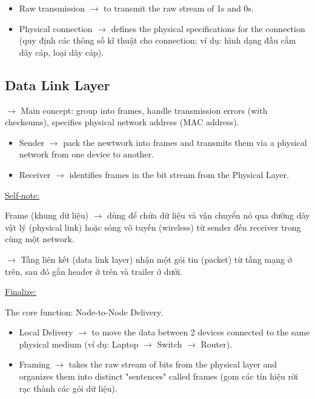 \begin{itemize}
    \item Raw transmission $\rightarrow$ to transmit the raw stream of 1s and 0s.
    \item Physical connection $\rightarrow$ defines the physical specifications for the connection (quy định các thông số kĩ thuật cho connection; ví dụ: hình dạng đầu cắm dây cáp, loại dây cáp).
\end{itemize}

\subsection{Data Link Layer}

\noindent
$\rightarrow$ Main concept: group into frames, handle transmission errors (with checksums), specifies physical network address (MAC address).
\medskip

\begin{itemize}
    \item Sender $\rightarrow$ pack the newtwork into frames and transmits them via a physical network from one device to another.
    \item Receiver $\rightarrow$ identifies frames in the bit stream from the Physical Layer.
\end{itemize}
\medskip

\noindent
\underline{Self-note:}
\medskip

\noindent
Frame (khung dữ liệu) $\rightarrow$ dùng để chứa dữ liệu và vận chuyển nó qua đường dây vật lý (physical link) hoặc sóng vô tuyến (wireless) từ sender đến receiver trong cùng một network.
\medskip

\noindent
$\rightarrow$ Tầng liên kết (data link layer) nhận một gói tin (packet) từ tầng mạng ở trên, sau đó gắn header ở trên và trailer ở dưới.
\medskip

\noindent
\underline{Finalize:}
\medskip

\noindent
The core function: Node-to-Node Delivery.

\begin{itemize}
    \item Local Delivery $\rightarrow$ to move the data between 2 devices connected to the same physical medium (ví dụ: Laptop $\rightarrow$ Switch $\rightarrow$ Router).
    \item Framing $\rightarrow$ takes the raw stream of bits from the physical layer and organizes them into distinct "sentences" called frames (gom các tín hiệu rời rạc thành các gói dữ liệu).
\end{itemize}
\medskip

